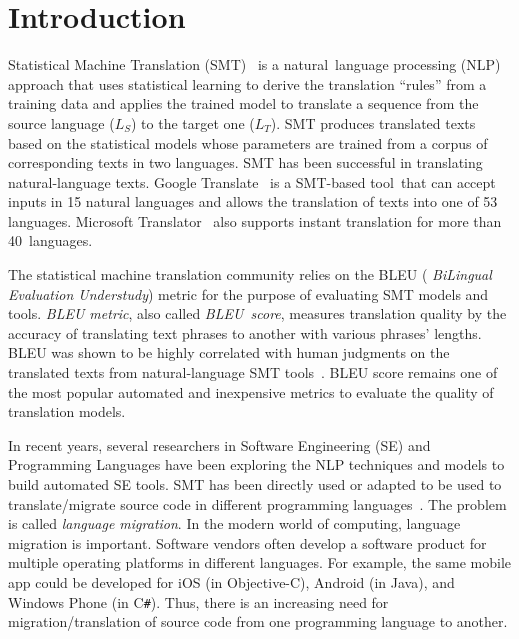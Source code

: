 \section{Introduction}
\label{sec:intro}

Statistical Machine Translation (SMT)~\cite{smtbook} is a
natural~language processing (NLP) approach that uses statistical
learning to derive the translation ``rules'' from a training data and
applies the trained model to translate a sequence from the source
language ($L_S$) to the target one ($L_T$). SMT produces translated
texts based on the statistical models whose parameters are trained
from a corpus of corresponding texts in two languages. SMT has
been successful in translating natural-language texts.  Google
Translate~\cite{googletranslate} is a SMT-based tool~that can accept
inputs in 15 natural languages and allows the translation of texts
into one of 53 languages. Microsoft Translator~\cite{mstranslator}
also supports instant translation for more than 40~languages.

The statistical machine translation community relies on the BLEU ({\em
  BiLingual Evaluation Understudy}) metric for the purpose of
evaluating SMT models and tools. {\em BLEU metric}, also called {\em
  BLEU~score}, measures translation quality by the accuracy of
translating text phrases to another with various phrases'
lengths. BLEU was shown to be highly correlated with human judgments
on the translated texts from natural-language SMT
tools~\cite{Papineni2002}. 
%
BLEU score remains one of the most popular automated and inexpensive
metrics to evaluate the quality of translation models.



In recent years, several researchers in Software Engineering (SE) and
Programming Languages have been exploring the NLP techniques and
models to build automated SE tools. SMT has been directly used or
adapted to be used to translate/migrate source code in different
programming
languages~\cite{fse13-nier,icse14-demo,karaivanov14,ase15,icsme16}. The
problem is called {\em language migration}. In the modern world of
computing, language migration is important. Software vendors often
develop a software product for multiple operating platforms in
different languages. For example, the same mobile app could be
developed for iOS (in Objective-C), Android (in Java), and Windows
Phone (in C\texttt{\#}).
Thus, there is an increasing need for migration/translation
of source code from one programming language to another.
%

